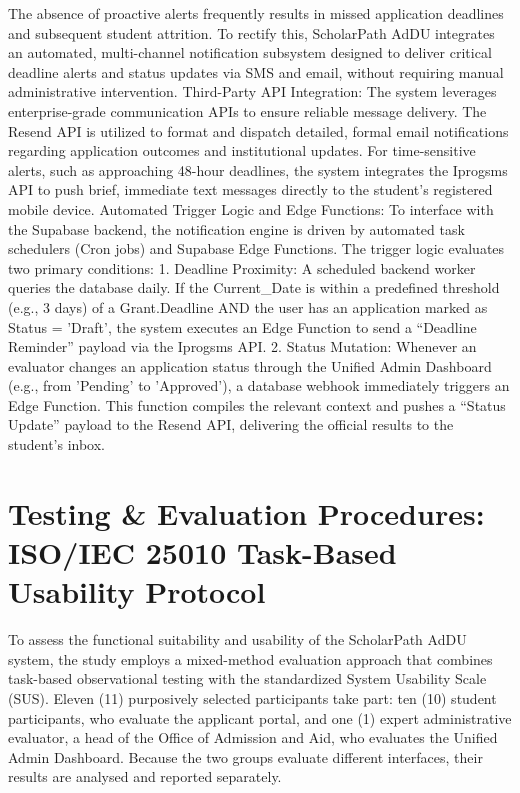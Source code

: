 The absence of proactive alerts frequently results in missed application deadlines and subsequent student attrition. To rectify this, ScholarPath AdDU integrates an automated, multi-channel notification subsystem designed to deliver critical deadline alerts and status updates via SMS and email, without requiring manual administrative intervention. Third-Party API Integration: The system leverages enterprise-grade communication APIs to ensure reliable message delivery. The Resend API is utilized to format and dispatch detailed, formal email notifications regarding application outcomes and institutional updates. For time-sensitive alerts, such as approaching 48-hour deadlines, the system integrates the Iprogsms API to push brief, immediate text messages directly to the student's registered mobile device. Automated Trigger Logic and Edge Functions: To interface with the Supabase backend, the notification engine is driven by automated task schedulers (Cron jobs) and Supabase Edge Functions. The trigger logic evaluates two primary conditions: 1. Deadline Proximity: A scheduled backend worker queries the database daily. If the Current\_Date is within a predefined threshold (e.g., 3 days) of a Grant.Deadline AND the user has an application marked as Status = 'Draft', the system executes an Edge Function to send a ``Deadline Reminder'' payload via the Iprogsms API. 2. Status Mutation: Whenever an evaluator changes an application status through the Unified Admin Dashboard (e.g., from 'Pending' to 'Approved'), a database webhook immediately triggers an Edge Function. This function compiles the relevant context and pushes a ``Status Update'' payload to the Resend API, delivering the official results to the student's inbox.

\section{Testing \& Evaluation Procedures: ISO/IEC 25010 Task-Based Usability Protocol}

To assess the functional suitability and usability of the ScholarPath
AdDU system, the study employs a mixed-method evaluation approach that
combines task-based observational testing with the standardized System
Usability Scale (SUS). Eleven (11) purposively selected participants
take part: ten (10) student participants, who evaluate the applicant
portal, and one (1) expert administrative evaluator, a head of the
Office of Admission and Aid, who evaluates the Unified Admin Dashboard.
Because the two groups evaluate different interfaces, their results are
analysed and reported separately.

